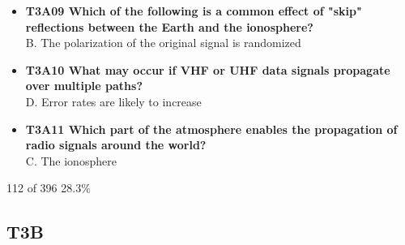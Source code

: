 \documentclass[10pt]{beamer}
\begin{document}
\begin{frame}
\begin{itemize}[<+->]
\item\textbf{T3A09 Which of the following is a common effect of "skip" reflections between the Earth and the ionosphere?}\\ B. The polarization of the original signal is randomized
\item\textbf{T3A10 What may occur if VHF or UHF data signals propagate over multiple paths?}\\ D. Error rates are likely to increase
\item\textbf{T3A11 Which part of the atmosphere enables the propagation of radio signals around the world?}\\ C. The ionosphere
\end{itemize}
\tiny 112 of 396 28.3\%
\end{frame}

\subsection{T3B}
\end{document}
